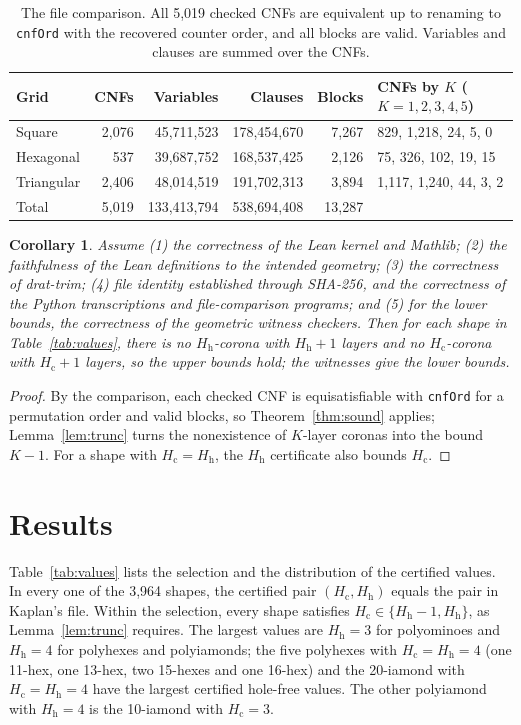\documentclass[10pt,a4paper]{article}
\newtheorem{corollary}[theorem]{Corollary}
\theoremstyle{definition}
\theoremstyle{remark}
\newcommand{\Hc}{H_{\mathrm c}}
\newcommand{\Hh}{H_{\mathrm h}}
\newcommand{\lean}[1]{\texttt{#1}}
\begin{document}
\begin{table}[!htbp]
\centering\small
\begin{tabular}{@{}lrrrrl@{}}
\toprule
Grid & CNFs & Variables & Clauses & Blocks & CNFs by $K$ ($K=1,2,3,4,5$)\\
\midrule
Square & 2,076 & 45,711,523 & 178,454,670 & 7,267 & 829, 1,218, 24, 5, 0\\
Hexagonal & 537 & 39,687,752 & 168,537,425 & 2,126 & 75, 326, 102, 19, 15\\
Triangular & 2,406 & 48,014,519 & 191,702,313 & 3,894 & 1,117, 1,240, 44, 3, 2\\
\midrule
Total & 5,019 & 133,413,794 & 538,694,408 & 13,287 & \\
\bottomrule
\end{tabular}
\caption{The file comparison. All 5,019 checked CNFs are equivalent up
to renaming to \lean{cnfOrd} with the recovered counter order, and all
blocks are valid. Variables and clauses are summed over the CNFs.}
\label{tab:bridge}
\end{table}

\begin{corollary}
\label{cor:chain}
Assume (1) the correctness of the Lean kernel and Mathlib;
(2) the faithfulness of the Lean definitions to the intended geometry;
(3) the correctness of drat-trim;
(4) file identity established through SHA-256, and the correctness of the
Python transcriptions and file-comparison programs; and
(5) for the lower bounds, the correctness of the geometric witness checkers. Then for each shape in
Table~\ref{tab:values}, there is no $\Hh$-corona with $\Hh+1$ layers and
no $\Hc$-corona with $\Hc+1$ layers, so the upper bounds hold; the
witnesses give the lower bounds.
\end{corollary}
\begin{proof}
By the comparison, each checked CNF is equisatisfiable with
\lean{cnfOrd} for a permutation order and valid blocks, so
Theorem~\ref{thm:sound} applies; Lemma~\ref{lem:trunc} turns the
nonexistence of $K$-layer coronas into the bound $K-1$. For a shape
with $\Hc=\Hh$, the $\Hh$ certificate also bounds $\Hc$.
\end{proof}

\section{Results}
\label{sec:results}
Table~\ref{tab:values} lists the selection and the distribution of the
certified values. In every one of the 3,964 shapes, the certified pair
$(\Hc,\Hh)$ equals the pair in Kaplan's file. Within the selection,
every shape satisfies $\Hc\in\{\Hh-1,\Hh\}$, as Lemma~\ref{lem:trunc}
requires. The largest values are $\Hh=3$ for polyominoes and $\Hh=4$ for
polyhexes and polyiamonds; the five polyhexes with $\Hc=\Hh=4$ (one
11-hex, one 13-hex, two 15-hexes and one 16-hex) and the 20-iamond with
$\Hc=\Hh=4$ have the largest certified hole-free values. The other
polyiamond with $\Hh=4$ is the 10-iamond with $\Hc=3$.
\end{document}
